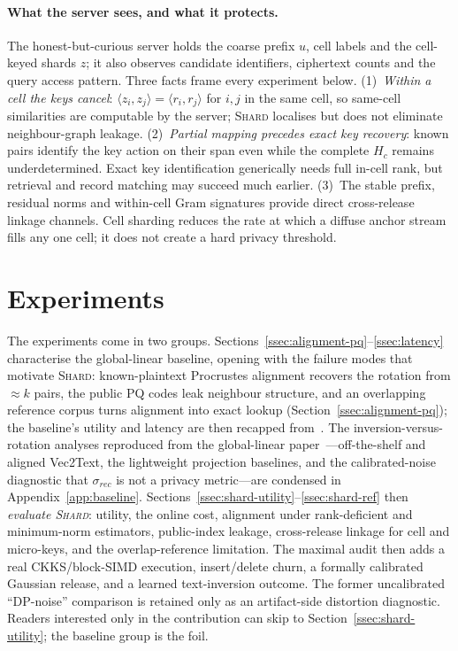 \paragraph{What the server sees, and what it protects.} The honest-but-curious
server holds the coarse prefix $u$, cell labels and the cell-keyed shards $z$;
it also observes candidate identifiers, ciphertext counts and the query access
pattern. Three facts
frame every experiment below. (1)~\emph{Within a cell the keys cancel}:
$\langle z_i,z_j\rangle=\langle r_i,r_j\rangle$ for $i,j$ in the same cell,
so same-cell similarities are computable by the server; \textsc{Shard}
localises but does not eliminate neighbour-graph leakage. (2)~\emph{Partial
mapping precedes exact key recovery}: known pairs identify the key action on
their span even while the complete $H_c$ remains underdetermined. Exact key
identification generically needs full in-cell rank, but retrieval and record
matching may succeed much earlier. (3)~The stable prefix, residual norms and
within-cell Gram signatures provide direct cross-release linkage channels.
Cell sharding reduces the rate at which a diffuse anchor stream fills any one
cell; it does not create a hard privacy threshold.

\section{Experiments}\label{sec:experiments}

The experiments come in two groups. Sections~\ref{ssec:alignment-pq}--\ref{ssec:latency} characterise the
global-linear baseline, opening with the failure modes that motivate
\textsc{Shard}: known-plaintext Procrustes alignment recovers the rotation
from $\approx k$ pairs, the public PQ codes leak neighbour structure, and an
overlapping reference corpus turns alignment into exact lookup
(Section~\ref{ssec:alignment-pq}); the baseline's utility and latency are
then recapped from~\cite{ref_vkit,ref_alpha}. The
inversion-versus-rotation analyses reproduced from the global-linear
paper~\cite{ref_alpha}---off-the-shelf and aligned Vec2Text, the
lightweight projection baselines, and the calibrated-noise diagnostic
that $\sigma_{rec}$ is not a privacy metric---are condensed in
Appendix~\ref{app:baseline}. Sections~\ref{ssec:shard-utility}--\ref{ssec:shard-ref}
then \emph{evaluate \textsc{Shard}}: utility, the online cost, alignment
under rank-deficient and minimum-norm estimators, public-index leakage,
cross-release linkage for cell and micro-keys, and the overlap-reference
limitation. The maximal audit then adds a real CKKS/block-SIMD execution,
insert/delete churn, a formally calibrated Gaussian release, and a learned
text-inversion outcome. The former uncalibrated ``DP-noise'' comparison is
retained only as an artifact-side distortion diagnostic.
Readers interested only in the contribution can skip to
Section~\ref{ssec:shard-utility}; the baseline group is the foil.

